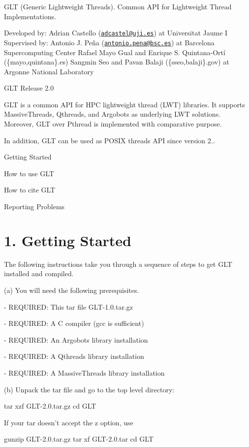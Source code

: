 G\-L\-T (Generic Lightweight Threads). Common A\-P\-I for Lightweight Thread Implementations.

Developed by\-: Adrian Castello (\href{mailto:adcastel@uji.es}{\tt adcastel@uji.\-es}) at Universitat Jaume I Supervised by\-: Antonio J. Peña (\href{mailto:antonio.pena@bsc.es}{\tt antonio.\-pena@bsc.\-es}) at Barcelona Supercomputing Center Rafael Mayo Gual and Enrique S. Quintana-\/\-Ortí (\{mayo,quintana\}.es) Sangmin Seo and Pavan Balaji (\{sseo,balaji\}.gov) at Argonne National Laboratory 

 \begin{DoxyVerb}        GLT Release 2.0
\end{DoxyVerb}


G\-L\-T is a common A\-P\-I for H\-P\-C lightweight thread (L\-W\-T) libraries. It supports Massive\-Threads, Qthreads, and Argobots as underlying L\-W\-T solutions. Moreover, G\-L\-T over Pthread is implemented with comparative purpose.

In addition, G\-L\-T can be used as P\-O\-S\-I\-X threads A\-P\-I since version 2..


\begin{DoxyEnumerate}
\item Getting Started
\item How to use G\-L\-T
\item How to cite G\-L\-T
\item Reporting Problems 


\end{DoxyEnumerate}

\section*{1. Getting Started }

The following instructions take you through a sequence of steps to get G\-L\-T installed and compiled.

(a) You will need the following prerequisites. \begin{DoxyVerb}- REQUIRED: This tar file GLT-1.0.tar.gz

- REQUIRED: A C compiler (gcc is sufficient)

- REQUIRED: An Argobots library installation

- REQUIRED: A Qthreads library installation

- REQUIRED: A MassiveThreads library installation
\end{DoxyVerb}


(b) Unpack the tar file and go to the top level directory\-: \begin{DoxyVerb}  tar xzf GLT-2.0.tar.gz
  cd GLT 

If your tar doesn't accept the z option, use

  gunzip GLT-2.0.tar.gz
  tar xf GLT-2.0.tar
  cd GLT
\end{DoxyVerb}


